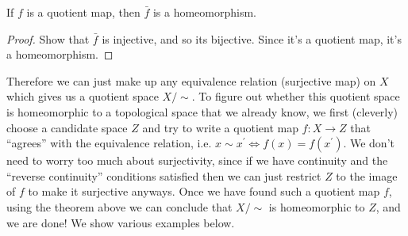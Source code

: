     \begin{corollary}
      If $f$ is a quotient map, then $\bar{f}$ is a homeomorphism. 
    \end{corollary}
    \begin{proof}
      Show that $\bar{f}$ is injective, and so its bijective. Since it's a quotient map, it's a homeomorphism. 
    \end{proof}

    Therefore we can just make up any equivalence relation (surjective map) on $X$ which gives us a quotient space $X/\sim$. To figure out whether this quotient space is homeomorphic to a topological space that we already know, we first (cleverly) choose a candidate space $Z$ and try to write a quotient map $f: X \rightarrow Z$ that ``agrees'' with the equivalence relation, i.e. $x \sim x^\prime \iff f(x) = f(x^\prime)$. We don't need to worry too much about surjectivity, since if we have continuity and the ``reverse continuity'' conditions satisfied then we can just restrict $Z$ to the image of $f$ to make it surjective anyways. Once we have found such a quotient map $f$, using the theorem above we can conclude that $X/\sim$ is homeomorphic to $Z$, and we are done! We show various examples below. 

